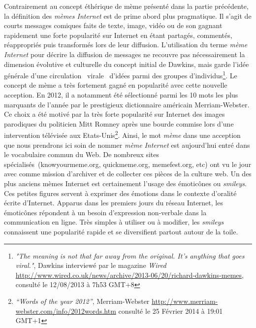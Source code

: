 Contrairement au concept éthérique de mème présenté dans la partie précédente, la définition des \textit{mèmes Internet }est de prime abord plus pragmatique. Il s{\textquoteright}agit de courts messages comiques faits de texte, image, vidéo ou de son gagnant rapidement une forte popularité sur Internet en étant partagés, commentés, réappropriés puis transformés lors de leur diffusion. L{\textquoteright}utilisation du terme \textit{mème Internet }pour décrire la diffusion de messages ne recouvre pas nécessairement la dimension évolutive et culturelle du concept initial de Dawkins, mais garde l{\textquoteright}idée générale d{\textquoteright}une circulation {\guillemotleft}~virale~{\guillemotright} d{\textquoteright}idées parmi des groupes d{\textquoteright}individus\footnote{ \textit{"The meaning is not that far away from the original. It's anything that goes viral."}, Dawkins interviewé par le magazine \textit{Wired} \url{http://www.wired.co.uk/news/archive/2013-06/20/richard-dawkins-memes}, consulté le 12/08/2013 à 7h53 GMT+8}. Le concept de mème a très fortement gagné en popularité avec cette nouvelle acception. En 2012, il a notamment été sélectionné parmi les 10 mots les plus marquants de l{\textquoteright}année par le prestigieux dictionnaire américain Merriam-Webster. Ce choix a été motivé par la très forte popularité sur Internet des images parodiques du politicien Mitt Romney après une bourde commise lors d{\textquoteright}une intervention télévisée aux Etats-Unis\footnote{ \textit{{\textquotedblleft}Words of the year 2012{\textquotedblright}}, Merriam-Webster \url{http://www.merriam-webster.com/info/2012words.htm} consulté le 25 Février 2014 à 19:01 GMT+1}. Ainsi, le mot \textit{mème }dans une acception que nous prendrons ici soin de nommer \textit{mème} \textit{Internet} est aujourd{\textquoteright}hui entré dans le vocabulaire commun du Web. De nombreux sites spécialisés~(knowyourmeme.org, quickmeme.org, memefest.org, etc) ont vu le jour avec comme mission d{\textquoteright}archiver et de collecter ces pièces de la culture web. Un des plus anciens mèmes Internet est certainement l{\textquoteright}usage des émoticônes ou \textit{smileys}. Ces petites figures servent à exprimer des émotions dans le contexte d{\textquoteright}oralité écrite d{\textquoteright}Internet. Apparus dans les premiers jours du réseau Internet, les émoticônes répondent à un besoin d{\textquoteright}expression non-verbale dans la communication en ligne. Très simples à utiliser ou à modifier, les \textit{smileys} connaissent une popularité rapide et se diversifient partout autour de la toile.  

